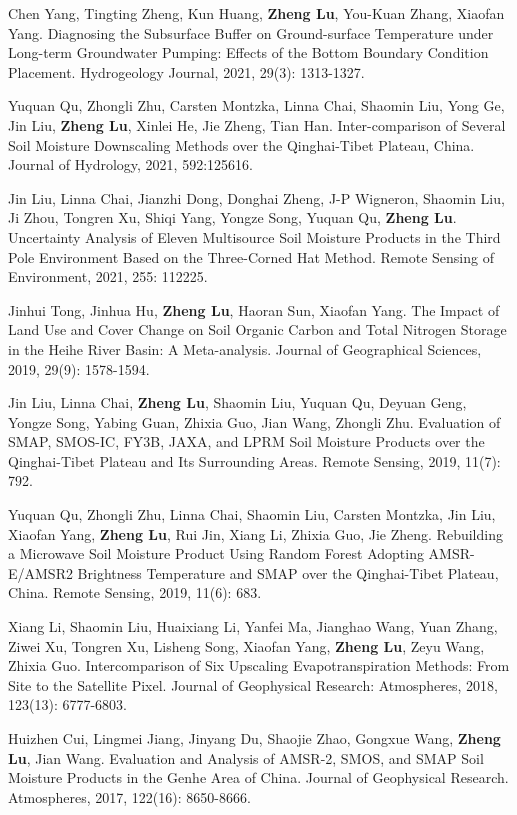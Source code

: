 \documentclass[letterpaper,11pt]{article}
\newcommand{\resumeItemlist}[1]{
  \item\small{
	{#1 \vspace{-4pt}}
  }
}
\begin{document}
      \resumeItemlist{Chen Yang, Tingting Zheng, Kun Huang, \textbf{Zheng Lu}, You-Kuan Zhang, Xiaofan Yang. Diagnosing the Subsurface Buffer on Ground-surface Temperature under Long-term Groundwater Pumping: Effects of the Bottom Boundary Condition Placement. Hydrogeology Journal, 2021, 29(3): 1313-1327.}
      \resumeItemlist{Yuquan Qu, Zhongli Zhu, Carsten Montzka, Linna Chai, Shaomin Liu, Yong Ge, Jin Liu, \textbf{Zheng Lu}, Xinlei He, Jie Zheng, Tian Han. Inter-comparison of Several Soil Moisture Downscaling Methods over the Qinghai-Tibet Plateau, China. Journal of Hydrology, 2021, 592:125616.}
      \resumeItemlist{Jin Liu, Linna Chai, Jianzhi Dong, Donghai Zheng, J-P Wigneron, Shaomin Liu, Ji Zhou, Tongren Xu, Shiqi Yang, Yongze Song, Yuquan Qu, \textbf{Zheng Lu}. Uncertainty Analysis of Eleven Multisource Soil Moisture Products in the Third Pole Environment Based on the Three-Corned Hat Method. Remote Sensing of Environment, 2021, 255: 112225. }
      \resumeItemlist{Jinhui Tong, Jinhua Hu, \textbf{Zheng Lu}, Haoran Sun, Xiaofan Yang. The Impact of Land Use and Cover Change on Soil Organic Carbon and Total Nitrogen Storage in the Heihe River Basin: A Meta-analysis. Journal of Geographical Sciences, 2019, 29(9): 1578-1594.}
      \resumeItemlist{Jin Liu, Linna Chai, \textbf{Zheng Lu}, Shaomin Liu, Yuquan Qu, Deyuan Geng, Yongze Song, Yabing Guan, Zhixia Guo, Jian Wang, Zhongli Zhu. Evaluation of SMAP, SMOS-IC, FY3B, JAXA, and LPRM Soil Moisture Products over the Qinghai-Tibet Plateau and Its Surrounding Areas. Remote Sensing, 2019, 11(7): 792.}
      \resumeItemlist{Yuquan Qu, Zhongli Zhu, Linna Chai, Shaomin Liu, Carsten Montzka, Jin Liu, Xiaofan Yang, \textbf{Zheng Lu}, Rui Jin, Xiang Li, Zhixia Guo, Jie Zheng. Rebuilding a Microwave Soil Moisture Product Using Random Forest Adopting AMSR-E/AMSR2 Brightness Temperature and SMAP over the Qinghai-Tibet Plateau, China. Remote Sensing, 2019, 11(6): 683.}
      \resumeItemlist{Xiang Li, Shaomin Liu, Huaixiang Li, Yanfei Ma, Jianghao Wang, Yuan Zhang, Ziwei Xu, Tongren Xu, Lisheng Song, Xiaofan Yang, \textbf{Zheng Lu}, Zeyu Wang, Zhixia Guo. Intercomparison of Six Upscaling Evapotranspiration Methods: From Site to the Satellite Pixel. Journal of Geophysical Research: Atmospheres, 2018, 123(13): 6777-6803.}
      \resumeItemlist{Huizhen Cui, Lingmei Jiang, Jinyang Du, Shaojie Zhao, Gongxue Wang, \textbf{Zheng Lu}, Jian Wang. Evaluation and Analysis of AMSR-2, SMOS, and SMAP Soil Moisture Products in the Genhe Area of China. Journal of Geophysical Research. Atmospheres, 2017, 122(16): 8650-8666.}
      
\end{document}
